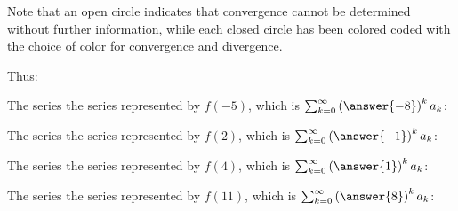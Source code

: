 \documentclass{ximera}
\begin{document}
\begin{exercise}
\begin{exercise}
\begin{image}
\end{image}


Note that an open circle indicates that convergence cannot be determined without further information, while each closed circle has been colored coded with the choice of color for convergence and divergence.

Thus:

\begin{exercise}
The series the series represented by $f(-5)$, which is $\sum_{k=0}^{\infty} \left(\answer{-8}\right)^k a_k$:
\begin{multipleChoice}
\end{multipleChoice}
\end{exercise}

 \begin{exercise}
The series the series represented by $f(2)$, which is $\sum_{k=0}^{\infty} \left(\answer{-1}\right)^k a_k$:
\begin{multipleChoice}
\end{multipleChoice}
\end{exercise}

\begin{exercise}
The series the series represented by $f(4)$, which is $\sum_{k=0}^{\infty} \left(\answer{1}\right)^k a_k$:
\begin{multipleChoice}
\end{multipleChoice}
\end{exercise}

\begin{exercise}
The series the series represented by $f(11)$, which is $\sum_{k=0}^{\infty} \left(\answer{8}\right)^k a_k$:
\begin{multipleChoice}
\end{multipleChoice}
\end{exercise}


\end{exercise}
\end{exercise}
\end{document}

